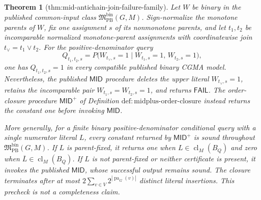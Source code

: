 \documentclass{article}
\newtheorem{theorem}{Theorem}
\begin{document}
\begin{theorem}[thm:mid-antichain-join-failure-family]\label{thm:mid-antichain-join-failure-family}
Let \(W\) be binary in the published common-input class \(\mathfrak M_{\mathrm{PB}}^{\mathrm{bin}}(G,M)\).  Sign-normalize the monotone parents of \(W\), fix one assignment \(s\) of its nonmonotone parents, and let \(t_1,t_2\) be incomparable normalized monotone-parent assignments with coordinatewise join \(t_{\vee}=t_1\vee t_2\).  For the positive-denominator query
\[
 Q_{t_1,t_2,s}
 =P\bigl(W_{t_{\vee},s}=1\mid W_{t_1,s}=1,\,W_{t_2,s}=1\bigr),
\]
one has \(Q_{t_1,t_2,s}=1\) in every compatible published binary CGMA model.  Nevertheless, the published \(\mathsf{MID}\) procedure deletes the upper literal \(W_{t_{\vee},s}=1\), retains the incomparable pair \(W_{t_1,s}=W_{t_2,s}=1\), and returns \(\mathsf{FAIL}\).  The order-closure procedure \(\mathsf{MID}^{+}\) of Definition \(\mathrm{def:midplus\text{-}order\text{-}closure}\) instead returns the constant one before invoking \(\mathsf{MID}\).

More generally, for a finite binary positive-denominator conditional query with a single numerator literal \(L\), every constant returned by \(\mathsf{MID}^{+}\) is sound throughout \(\mathfrak M_{\mathrm{PB}}^{\mathrm{bin}}(G,M)\).  If \(L\) is parent-fixed, it returns one when \(L\in\operatorname{cl}_M(B_Q)\) and zero when \(\overline L\in\operatorname{cl}_M(B_Q)\).  If \(L\) is not parent-fixed or neither certificate is present, it invokes the published \(\mathsf{MID}\), whose successful output remains sound.  The closure terminates after at most \(2\sum_{v\in V}2^{|\operatorname{pa}_G(v)|}\) distinct literal insertions.  This precheck is not a completeness claim.
\end{theorem}
\end{document}
